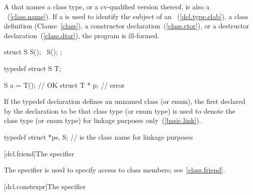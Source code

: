 \pnum
\begin{note}
%
A  that names a class type, or a cv-qualified
version thereof, is also a ~(\ref{class.name}). If
a  is used to identify the subject of an
~(\ref{dcl.type.elab}), a class
definition (Clause~\ref{class}), a constructor
declaration~(\ref{class.ctor}), or a destructor
declaration~(\ref{class.dtor}), the program is ill-formed.
\end{note}
\begin{example}

\begin{codeblock}
struct S {
  S();
  ~S();
};

typedef struct S T;

S a = T();                      // OK
struct T * p;                   // error
\end{codeblock}
\end{example}

\pnum
{}%
%
%
If the typedef declaration defines an unnamed class (or enum), the first
 declared by the declaration to be that class
type (or enum type) is used to denote the class type (or enum type) for
linkage purposes only~(\ref{basic.link}).
\begin{example}

\begin{codeblock}
typedef struct { } *ps, S;      //  is the class name for linkage purposes
\end{codeblock}
\end{example}

[dcl.friend]{The  specifier}%

\pnum
The  specifier is used to specify access to class members;
see~\ref{class.friend}.

[dcl.constexpr]{The  specifier}%

